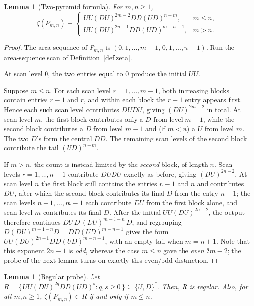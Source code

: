 \documentclass[11pt]{article}
\newtheorem{lemma}[theorem]{Lemma}
\theoremstyle{definition}
\begin{document}
\begin{lemma}[Two-pyramid formula]\label{lem:zeta-two-pyramid}
For $m,n\ge 1$,
\[
\zeta(P_{m,n})=
\begin{cases}
   UU(DU)^{2m-2}DD(UD)^{n-m}, & m\le n,\\[1mm]
   UU(DU)^{2n-1}DD(UD)^{m-n-1}, & m>n.
\end{cases}
\]
\end{lemma}

\begin{proof}
The area sequence of $P_{m,n}$ is
\(
   (0,1,\ldots,m-1,\,0,1,\ldots,n-1).
\)
Run the area-sequence scan of Definition~\ref{def:zeta}.

At scan level $0$, the two entries equal to $0$ produce the initial $UU$.

Suppose $m\le n$.  For each scan level $r=1,\ldots,m-1$, both increasing blocks
contain entries $r-1$ and $r$, and within each block the $r-1$ entry
appears first.  Hence each such scan level contributes $DUDU$, giving
$(DU)^{2m-2}$ in total.  At scan level $m$, the first block contributes only a
$D$ from level $m-1$, while the second block contributes a $D$ from level
$m-1$ and (if $m<n$) a $U$ from level $m$.  The two $D$'s form the central
$DD$.  The remaining scan levels of the second block contribute the tail
$(UD)^{n-m}$.

If $m>n$, the count is instead limited by the \emph{second} block, of length
$n$.  Scan levels $r=1,\ldots,n-1$ contribute $DUDU$ exactly as before, giving
$(DU)^{2n-2}$.  At scan level $n$ the first block still contains the entries $n-1$
and $n$ and contributes $DU$, after which the second block contributes its
final $D$ from the entry $n-1$; the scan levels $n+1,\ldots,m-1$ each contribute
$DU$ from the first block alone, and scan level $m$ contributes its final $D$.  After the
initial $UU(DU)^{2n-2}$, the output therefore continues
$DU\,D\,(DU)^{m-1-n}\,D$, and regrouping $D(DU)^{m-1-n}D=DD(UD)^{m-n-1}$ gives
the form $UU(DU)^{2n-1}DD(UD)^{m-n-1}$, with an empty tail when
$m=n+1$.  Note that this exponent $2n-1$ is \emph{odd}, whereas the
case $m\le n$ gave the \emph{even} $2m-2$; the probe of the next lemma turns on
exactly this even/odd distinction.
\end{proof}

\begin{lemma}[Regular probe]\label{lem:zeta-probe}
Let $R = \{\,UU(DU)^{2q}DD(UD)^s : q,s\ge 0\,\}\subseteq\{U,D\}^*$.
Then, $R$ is regular. Also, for all $m,n\ge 1$,
$\zeta(P_{m,n})\in R$ if and only if $m\le n$.
\end{lemma}
\end{document}
